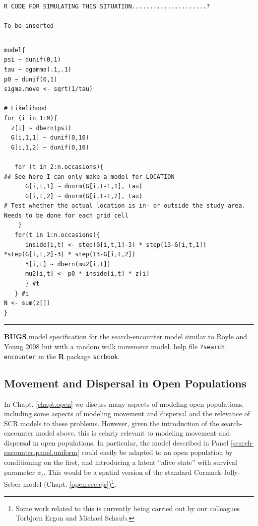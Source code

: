 \begin{verbatim}
R CODE FOR SIMULATING THIS SITUATION.....................?

To be inserted
\end{verbatim}


\begin{panel}[htp]
\centering
\rule[0.15in]{\textwidth}{.03in}
{\small
\begin{verbatim}
model{
psi ~ dunif(0,1)
tau ~ dgamma(.1,.1)
p0 ~ dunif(0,1)
sigma.move <- sqrt(1/tau)

# Likelihood
for (i in 1:M){
  z[i] ~ dbern(psi)
  G[i,1,1] ~ dunif(0,16)
  G[i,1,2] ~ dunif(0,16)

   for (t in 2:n.occasions){
## See here I can only make a model for LOCATION
      G[i,t,1] ~ dnorm(G[i,t-1,1], tau)
      G[i,t,2] ~ dnorm(G[i,t-1,2], tau)
# Test whether the actual location is in- or outside the study area. Needs to be done for each grid cell
    }
   for(t in 1:n.occasions){
      inside[i,t] <- step(G[i,t,1]-3) * step(13-G[i,t,1]) *step(G[i,t,2]-3) * step(13-G[i,t,2])
      Y[i,t] ~ dbern(mu2[i,t])
      mu2[i,t] <- p0 * inside[i,t] * z[i]
      } #t
   } #i
N <- sum(z[])
}
\end{verbatim}
}
\rule[-0.15in]{\textwidth}{.03in}
\caption{
{\bf BUGS} model specification for the search-encounter model similar
to Royle and Young 2008 but with a random walk movement model.
help file \mbox{\tt ?search$\_$encounter} in the {\bf R} package \mbox{\tt scrbook}.
}
\label{search-encounter.panel.uniform}
\end{panel}

\subsection{Movement and Dispersal in Open Populations}

In Chapt. \ref{chapt.open} we discuss many aspects of modeling open
populations, including some aspects of modeling movement and dispersal
and the relevance of SCR models to these problems. However, given the
introduction of the search-encounter model above, this is celarly
relevant to modeling movement and dispersal in open populations.  In
particular, the model described in Panel
\ref{search-encounter.panel.uniform} could easily be adapted to an
open population by conditioning on the first, and introducing a latent
``alive state'' with survival parameter $\phi_{t}$. This would be a
spatial version of the standard Cormack-Jolly-Seber model
(Chapt. \ref{open.sec.cjs})\footnote{Some work related to this is
  currently being carried out by our colleagues Torbjorn Ergon and
  Michael Schaub.}.

